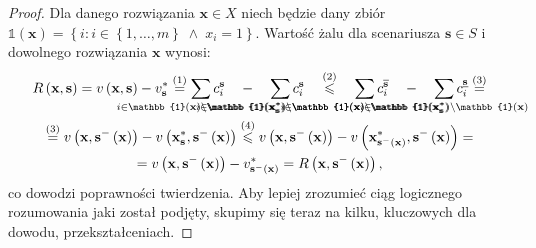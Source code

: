 \begin{proof}
	Dla danego rozwiązania $ \textbf{x} \in X$ niech będzie dany zbiór $\mathbb{1} \left( \textbf{x} \right) = \left\{ i : i \in \left\{ 1, \dots, m \right\} \; \wedge \; x_{i} = 1 \right\}$. Wartość żalu dla scenariusza $\textbf{s} \in S$ i dowolnego rozwiązania $\textbf{x}$ wynosi:
	\begin{gather*}
		R \left( \textbf{x}, \textbf{s} \right) = v \left( \textbf{x}, \textbf{s} \right) - v^{\ast}_{\textbf{s}} \overset{\left( 1 \right)}{=} \sum_{\mathclap{i \in \mathbb{1} \left( \textbf{x} \right) \setminus \mathbb{1} \left( \textbf{x}^{\ast}_{\textbf{s}} \right)}} c_{i}^{\textbf{s}} \quad - \quad \sum_{\mathclap{i \in \mathbb{1} \left( \textbf{x}^{\ast}_{\textbf{s}} \right) \setminus \mathbb{1} \left( \textbf{x} \right)}} c_{i}^{\textbf{s}} \quad \overset{\left( 2 \right)}{\leqslant} \quad \sum_{\mathclap{i \in \mathbb{1} \left( \textbf{x} \right) \setminus \mathbb{1} \left( \textbf{x}^{\ast}_{\textbf{s}} \right)}} c^{\overline{\textbf{s}}}_{i} \quad - \quad \sum_{\mathclap{i \in \mathbb{1} \left( \textbf{x}^{\ast}_{\textbf{s}} \right) \setminus \mathbb{1} \left( \textbf{x} \right)}} c^{\underline{\textbf{s}}}_{i} \overset{\left( 3 \right)}{=} \\ \overset{\left( 3 \right)}{=} v \left( \textbf{x}, \textbf{s}^{-} \left( \textbf{x} \right) \right) - v \left( \textbf{x}^{\ast}_{\textbf{s}}, \textbf{s}^{-} \left( \textbf{x} \right) \right) \overset{\left( 4 \right)}{\leqslant} v \left( \textbf{x}, \textbf{s}^{-} \left( \textbf{x} \right) \right) - v \left( \textbf{x}^{\ast}_{\textbf{s}^{-} \left( \textbf{x} \right)}, \textbf{s}^{-} \left( \textbf{x} \right) \right) = \\ = v \left( \textbf{x}, \textbf{s}^{-} \left( \textbf{x} \right) \right) - v^{\ast}_{\textbf{s}^{-} \left( \textbf{x} \right)} = R \left( \textbf{x}, \textbf{s}^{-} \left( \textbf{x} \right) \right)\text{,}
	\end{gather*}
	co dowodzi poprawności twierdzenia. Aby lepiej zrozumieć ciąg logicznego rozumowania jaki został podjęty, skupimy się teraz na kilku, kluczowych dla dowodu, przekształceniach.
	

\end{proof}
